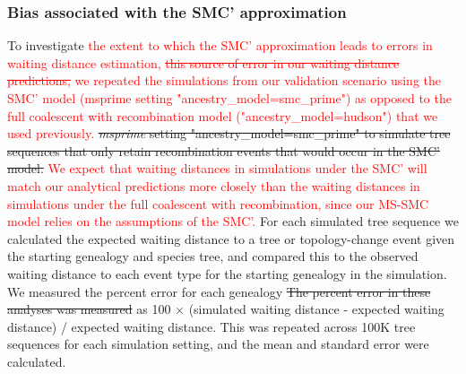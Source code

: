 \documentclass[11pt]{article}
\begin{document}
\subsubsection{Bias associated with the SMC' approximation}
To investigate 
\textcolor{red}{
the extent to which the SMC' approximation leads to errors in waiting
distance estimation, 
\sout{this source of error in our waiting distance predictions,}
we repeated the simulations from our validation scenario using the SMC'
model (msprime setting "ancestry\_model=smc\_prime") as opposed to the 
full coalescent with recombination model ("ancestry\_model=hudson") that
we used previously.
}
\sout{\emph{msprime} setting "ancestry\_model=smc\_prime" to simulate tree sequences 
that only retain recombination events that would occur in the SMC' model.
}
% 
\textcolor{red}{
We expect that waiting distances in simulations under the SMC' will match 
our analytical predictions more closely than the waiting distances in 
simulations under the full coalescent with recombination, since our MS-SMC
model relies on the assumptions of the SMC'.
}
% 
For each simulated tree sequence we calculated the expected waiting distance to 
a tree or topology-change event given the starting genealogy and species tree, 
and compared this to the observed waiting distance to each event type for the
starting genealogy in the simulation.
% 
We measured the percent error for each genealogy
\sout{The percent error in these analyses was measured}
as 100 $\times$ (simulated waiting distance - expected waiting distance) / expected waiting distance.
This was repeated across 100K tree sequences for each simulation setting, 
and the mean and standard error were calculated.
\end{document}
